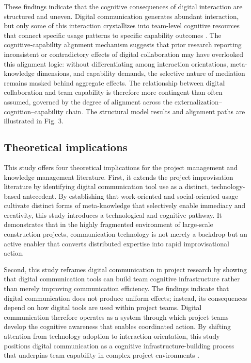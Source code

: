 \documentclass[authoryear,preprint,review,times,10pt]{elsarticle}
\begin{document}
These findings indicate that the cognitive consequences of digital interaction are structured and uneven. Digital communication generates abundant interaction, but only some of this interaction crystallizes into team-level cognitive resources that connect specific usage patterns to specific capability outcomes \citep{ye2021Leveraging, zaverzhenets2021Digitalising}. The cognitive-capability alignment mechanism suggests that prior research reporting inconsistent or contradictory effects of digital collaboration \citep{kane2014Whats} may have overlooked this alignment logic: without differentiating among interaction orientations, meta-knowledge dimensions, and capability demands, the selective nature of mediation remains masked behind aggregate effects. The relationship between digital collaboration and team capability is therefore more contingent than often assumed, governed by the degree of alignment across the externalization--cognition--capability chain. The structural model results and alignment paths are illustrated in Fig. 3.

\subsection{Theoretical implications}

This study offers four theoretical implications for the project management and knowledge management literature. First, it extends the project improvisation literature by identifying digital communication tool use as a distinct, technology-based antecedent. By establishing that work-oriented and social-oriented usage cultivate distinct forms of meta-knowledge that selectively enable immediacy and creativity, this study introduces a technological and cognitive pathway. It demonstrates that in the highly fragmented environment of large-scale construction projects, communication technology is not merely a backdrop but an active enabler that converts distributed expertise into rapid improvisational action.

Second, this study reframes digital communication in project research by showing that digital communication tools can build team cognitive infrastructure rather than merely improving communication efficiency. The findings indicate that digital communication does not produce uniform effects; instead, its consequences depend on how digital tools are used within project teams. Digital communication therefore operates as a system through which project teams develop the cognitive awareness that enables coordinated action. By shifting attention from technology adoption to interaction orientation, this study positions digital communication as a cognitive infrastructure-building process that underpins team capability in complex project environments \citep{leonardi2015Ambient}.
\end{document}
